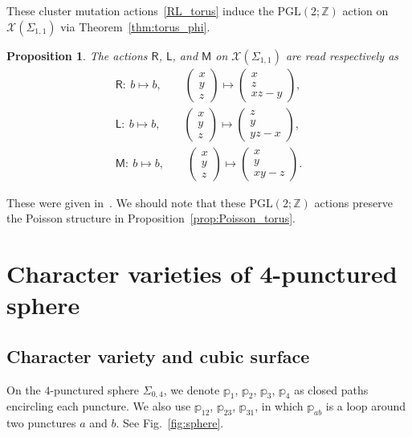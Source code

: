 \documentclass[pdftex]{sigma}
\numberwithin{equation}{section}
\newtheorem{Proposition}[Theorem]{Proposition}
 { \theoremstyle{definition}
\newtheorem{Definition}[Theorem]{Definition}
\newtheorem{Note}[Theorem]{Note}
\newtheorem{Example}[Theorem]{Example}
\newtheorem{Remark}[Theorem]{Remark} }
\begin{document}
These cluster mutation actions~\eqref{RL_torus} induce the $\mathrm{PGL}(2;\mathbb{Z})$ action on $\mathcal{X}(\Sigma_{1,1})$ via Theorem~\ref{thm:torus_phi}.

\begin{Proposition} The actions $\mathsf{R}$, $\mathsf{L}$, and $\mathsf{M}$
 on $\mathcal{X}(\Sigma_{1,1})$ are read respectively as
 \begin{gather*} %
 \mathsf{R} \colon \ b \mapsto b, \qquad
 \begin{pmatrix}
 x \\ y \\ z
 \end{pmatrix}
 \mapsto
 \begin{pmatrix}
 x \\
 z \\
 x z - y
 \end{pmatrix} , \\
 \mathsf{L}\colon \ b \mapsto b, \qquad
 \begin{pmatrix}
 x \\ y \\ z
 \end{pmatrix}
 \mapsto
 \begin{pmatrix}
 z \\ y \\ y z - x
 \end{pmatrix} ,\\
 \mathsf{M}\colon \ b \mapsto b,
 \qquad
 \begin{pmatrix}
 x \\ y \\ z
 \end{pmatrix}
 \mapsto
 \begin{pmatrix}
 x \\ y \\ x y - z
 \end{pmatrix} .
 \end{gather*}
\end{Proposition}
These were given in~\cite{WGold03a}. We should note that these $\mathrm{PGL}(2;\mathbb{Z})$ actions preserve the Poisson structure in Proposition~\ref{prop:Poisson_torus}.

\section{Character varieties of 4-punctured sphere}\label{sec:sphere}

\subsection{Character variety and cubic surface}
On the $4$-punctured sphere $\Sigma_{0,4}$, we denote $\mathbb{p}_1$, $\mathbb{p}_2$, $\mathbb{p}_3$, $\mathbb{p}_4$ as closed paths encircling each puncture. We also use $\mathbb{p}_{12}$, $\mathbb{p}_{23}$, $\mathbb{p}_{31}$, in which $\mathbb{p}_{ab}$ is a loop around two punctures $a$ and $b$. See Fig.~\ref{fig:sphere}.
\end{document}
